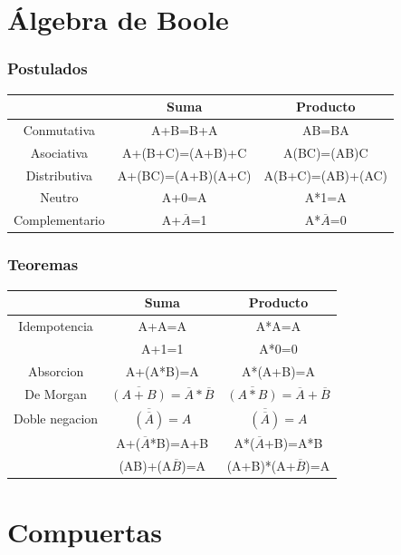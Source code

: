 \documentclass{beamer}
\begin{document}
\section{Álgebra de Boole}

\begin{frame}
\frametitle{Postulados}

\begin{tabular}{c|c|c}
 & Suma & Producto \\ 
\hline 
Conmutativa & A+B=B+A & AB=BA \\ 
Asociativa & A+(B+C)=(A+B)+C & A(BC)=(AB)C \\ 
Distributiva & A+(BC)=(A+B)(A+C) & A(B+C)=(AB)+(AC) \\ 
Neutro & A+0=A & A*1=A \\ 
Complementario & A+$\overline{A}$=1 & A*$\overline{A}$=0 \\ 
\end{tabular} 

\end{frame}

\begin{frame}
\frametitle{Teoremas}
\begin{tabular}{c|c|c}
 & Suma & Producto \\ 
\hline 
Idempotencia & A+A=A & A*A=A \\ 
			 & A+1=1 & A*0=0 \\ 
Absorcion & A+(A*B)=A & A*(A+B)=A \\ 
De Morgan & $\overline{(A+B)}=\overline{A}*\overline{B}$ & $\overline{(A*B)}=\overline{A}+\overline{B}$ \\ 
Doble negacion & $\overline{(\overline{A})}=A$ & $\overline{(\overline{A})}=A$ \\ 
 & A+($\overline{A}$*B)=A+B & A*($\overline{A}$+B)=A*B \\ 
 & (AB)+(A$\overline{B}$)=A & (A+B)*(A+$\overline{B}$)=A \\ 
\end{tabular} 
\end{frame}

\section{Compuertas}
\end{document}

